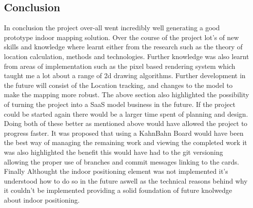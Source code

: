\subsection{Conclusion}
In conclusion the project over-all went incredibly well generating a good prototype indoor mapping solution. Over the course of the project lot's of new skills and knowledge where learnt either from the research such as the theory of location calculation, methods and technologies. Further knowledge was also learnt from areas of implementation such as the pixel based rendering system which taught me a lot about a range of 2d drawing algorithms.
Further development in the future will consist of the Location tracking, and changes to the model to make the mapping more robust. The above section also highlighted the possibility of turning the project into a SaaS model business in the future. If the project could be started again there would be a larger time spent of planning and design. Doing both of these better as mentioned above would have allowed the project to progress faster. It was proposed that using a KahnBahn Board would have been the best way of managing the remaining work and viewing the completed work it was also highlighted the benefit this would have had to the git versioning allowing the proper use of branches and commit messages linking to the cards.
Finally Althought the indoor positioning element was not implemented it's understood how to do so in the future aswell as the technical reasons behind why it couldn't be implemented providing a solid foundation of future knolwedge about indoor positioning.

